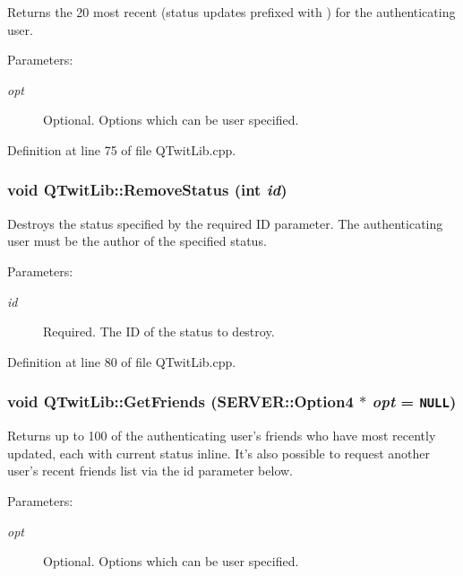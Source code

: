 Returns the 20 most recent  (status updates prefixed with ) for the authenticating user. \begin{Desc}
\item[Parameters:]
\begin{description}
\item[{\em opt}]Optional. Options which can be user specified. \end{description}
\end{Desc}


Definition at line 75 of file QTwitLib.cpp.\hypertarget{classQTwitLib_8d5971709c2feaa30193fcb2918017f9}{
\subsubsection{\setlength{\rightskip}{0pt plus 5cm}void QTwitLib::RemoveStatus (int {\em id})}}
\label{classQTwitLib_8d5971709c2feaa30193fcb2918017f9}


Destroys the status specified by the required ID parameter. The authenticating user must be the author of the specified status. \begin{Desc}
\item[Parameters:]
\begin{description}
\item[{\em id}]Required. The ID of the status to destroy. \end{description}
\end{Desc}


Definition at line 80 of file QTwitLib.cpp.\hypertarget{classQTwitLib_c3850ca7725d87d78c57a2dfb298af9f}{
\subsubsection{\setlength{\rightskip}{0pt plus 5cm}void QTwitLib::GetFriends ({\bf SERVER::Option4} $\ast$ {\em opt} = {\tt NULL})}}
\label{classQTwitLib_c3850ca7725d87d78c57a2dfb298af9f}


Returns up to 100 of the authenticating user's friends who have most recently updated, each with current status inline. It's also possible to request another user's recent friends list via the id parameter below. \begin{Desc}
\item[Parameters:]
\begin{description}
\item[{\em opt}]Optional. Options which can be user specified. \end{description}
\end{Desc}



